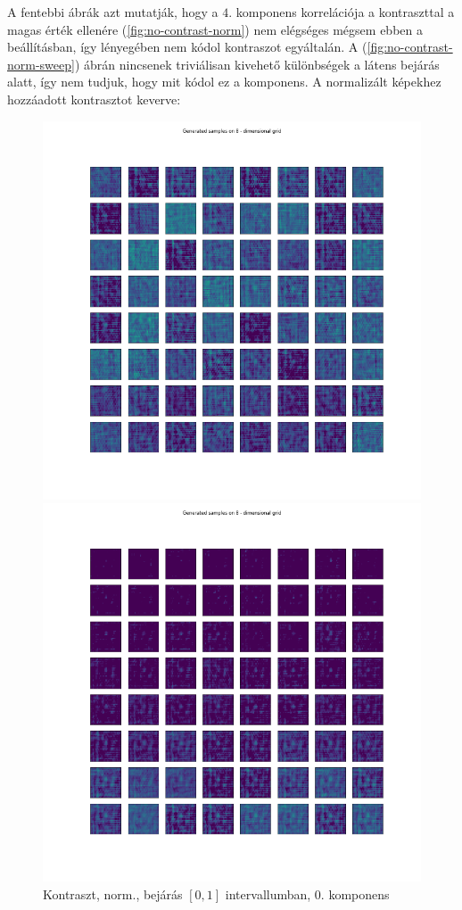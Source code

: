 \documentclass[12pt, english]{article}
\begin{document}
 \par A fentebbi ábrák azt mutatják, hogy a $4.$ komponens korrelációja a kontraszttal a magas érték ellenére (\ref{fig:no-contrast-norm}) nem elégséges mégsem ebben a beállításban, így lényegében nem kódol kontraszot egyáltalán. A (\ref{fig:no-contrast-norm-sweep}) ábrán nincsenek triviálisan kivehető különbségek a látens bejárás alatt, így nem tudjuk, hogy mit kódol ez a komponens. A normalizált képekhez hozzáadott kontrasztot keverve:

\vspace{4mm}
 
\begin{figure}[H]
  \begin{minipage}{0.5\linewidth}
    \centering
    \includegraphics[width=.85\linewidth]{sweep/norm_contrast_sweep_zero_to_one_0th_param.png} 
    \caption{Kontraszt, norm., bejárás $[0, 1]$ \newline intervallumban, $0.$ komponens} 
    \label{fig:contrast-norm-sweep-0}
  \end{minipage} 
  \begin{minipage}{0.5\linewidth}
    \centering
    \includegraphics[width=.85\linewidth]{sweep/norm_contrast_sweep_minus_two_to_one_2nd_param.png} 

\end{minipage}
\end{figure}
\end{document}

